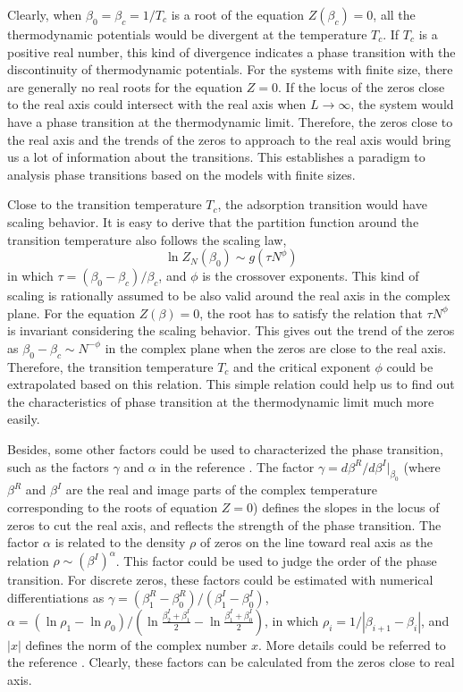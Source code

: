 \documentclass[aps,pre,twocolumn,showpacs,preprintnumbers,amsmath,amssymb]{revtex4-1}
\begin{document}
Clearly, when $\beta_0=\beta_c=1/T_c$ is a root of the equation $Z(\beta_c)=0$,
all the thermodynamic potentials would be divergent at the temperature $T_c$.
If $T_c$ is a positive real number, this kind of divergence indicates a phase
transition with the discontinuity of thermodynamic potentials. For the systems
with finite size, there are generally no real roots for the equation $Z=0$.
If the locus of the zeros close to the real axis could intersect with the
real axis when $L\rightarrow\infty$, the system would have a phase transition
at the thermodynamic limit. Therefore, the zeros close to the real axis and
the trends of the zeros to approach to the real axis would bring us a lot of
information about the transitions. This establishes a paradigm to analysis
phase transitions based on the models with finite sizes.

Close to the transition temperature $T_c$, the adsorption transition
would have scaling behavior. It is easy to derive that the partition
function around the transition temperature also follows the scaling law,
\begin{equation}
\ln Z_N(\beta_0) \sim g(\tau N^{\phi}) \,
\end{equation}
in which $\tau=(\beta_0-\beta_c)/\beta_c$, and $\phi$ is the crossover
exponents.  This kind of scaling is rationally assumed to be also valid
around the real axis in
the complex plane. For the equation $Z(\beta)=0$, the root has to satisfy
the relation that $\tau N^{\phi}$ is invariant considering the scaling
behavior. This gives out the trend of the zeros as
$\beta_0-\beta_c \sim N^{-\phi}$ in the complex plane when the zeros are
close to the real axis. Therefore, the
transition temperature $T_c$ and the critical exponent $\phi$ could be
extrapolated based on this relation. This simple relation could help us to
find out the characteristics of phase transition at the thermodynamic limit
much more easily.

Besides, some other factors could be used
to characterized the phase transition, such as the factors $\gamma$ and
$\alpha$ in the reference \cite{WangJCP03}. The factor $\gamma=d \beta^R/d
\beta^I|_{\beta_0}$ (where $\beta^R$ and $\beta^I$ are the real and image
parts of the complex temperature corresponding to the roots of equation
$Z=0$) defines the slopes in the locus
of zeros to cut the real axis, and reflects the strength of the phase
transition. The factor $\alpha$ is related to the density $\rho$ of zeros on
the line toward real axis as the relation $\rho \sim (\beta^I)^{\alpha}$.
This factor could be used to judge the order of the phase transition.
For discrete zeros, these factors could be estimated with numerical
differentiations as $\gamma=(\beta_1^R-\beta_0^R)/(\beta^I_1-\beta^I_0)$,
$\alpha=(\ln \rho_1-\ln \rho_0)/(\ln\frac{\beta_2^I+\beta_1^I}{2}-
\ln\frac{\beta_1^I+\beta_0^I}{2})$, in which $\rho_i=1/|\beta_{i+1}-\beta_i|$,
and $|x|$ defines the norm
of the complex number $x$. More details could be referred to the reference
\cite{WangJCP03}.  Clearly,
these factors can be calculated from the zeros close to real axis.
\end{document}

